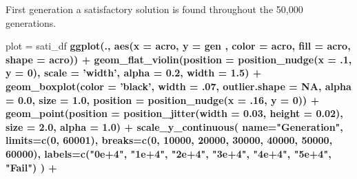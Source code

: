 \documentclass[]{book}
\newenvironment{Shaded}{\begin{snugshade}}{\end{snugshade}}
\newcommand{\DataTypeTok}[1]{\textcolor[rgb]{0.13,0.29,0.53}{#1}}
\newcommand{\DecValTok}[1]{\textcolor[rgb]{0.00,0.00,0.81}{#1}}
\newcommand{\FloatTok}[1]{\textcolor[rgb]{0.00,0.00,0.81}{#1}}
\newcommand{\KeywordTok}[1]{\textcolor[rgb]{0.13,0.29,0.53}{\textbf{#1}}}
\newcommand{\NormalTok}[1]{#1}
\newcommand{\OperatorTok}[1]{\textcolor[rgb]{0.81,0.36,0.00}{\textbf{#1}}}
\newcommand{\OtherTok}[1]{\textcolor[rgb]{0.56,0.35,0.01}{#1}}
\newcommand{\StringTok}[1]{\textcolor[rgb]{0.31,0.60,0.02}{#1}}
\begin{document}
First generation a satisfactory solution is found throughout the 50,000 generations.

\begin{Shaded}
\begin{Highlighting}[]
\NormalTok{plot =}\StringTok{ }\NormalTok{sati_df }\OperatorTok{%>%}
\StringTok{  }\KeywordTok{ggplot}\NormalTok{(., }\KeywordTok{aes}\NormalTok{(}\DataTypeTok{x =}\NormalTok{ acro, }\DataTypeTok{y =}\NormalTok{ gen , }\DataTypeTok{color =}\NormalTok{ acro, }\DataTypeTok{fill =}\NormalTok{ acro, }\DataTypeTok{shape =}\NormalTok{ acro)) }\OperatorTok{+}
\StringTok{  }\KeywordTok{geom_flat_violin}\NormalTok{(}\DataTypeTok{position =} \KeywordTok{position_nudge}\NormalTok{(}\DataTypeTok{x =} \FloatTok{.1}\NormalTok{, }\DataTypeTok{y =} \DecValTok{0}\NormalTok{), }\DataTypeTok{scale =} \StringTok{'width'}\NormalTok{, }\DataTypeTok{alpha =} \FloatTok{0.2}\NormalTok{, }\DataTypeTok{width =} \FloatTok{1.5}\NormalTok{) }\OperatorTok{+}
\StringTok{  }\KeywordTok{geom_boxplot}\NormalTok{(}\DataTypeTok{color =} \StringTok{'black'}\NormalTok{, }\DataTypeTok{width =} \FloatTok{.07}\NormalTok{, }\DataTypeTok{outlier.shape =} \OtherTok{NA}\NormalTok{, }\DataTypeTok{alpha =} \FloatTok{0.0}\NormalTok{, }\DataTypeTok{size =} \FloatTok{1.0}\NormalTok{, }\DataTypeTok{position =} \KeywordTok{position_nudge}\NormalTok{(}\DataTypeTok{x =} \FloatTok{.16}\NormalTok{, }\DataTypeTok{y =} \DecValTok{0}\NormalTok{)) }\OperatorTok{+}
\StringTok{  }\KeywordTok{geom_point}\NormalTok{(}\DataTypeTok{position =} \KeywordTok{position_jitter}\NormalTok{(}\DataTypeTok{width =} \FloatTok{0.03}\NormalTok{, }\DataTypeTok{height =} \FloatTok{0.02}\NormalTok{), }\DataTypeTok{size =} \FloatTok{2.0}\NormalTok{, }\DataTypeTok{alpha =} \FloatTok{1.0}\NormalTok{) }\OperatorTok{+}
\StringTok{  }\KeywordTok{scale_y_continuous}\NormalTok{(}
    \DataTypeTok{name=}\StringTok{"Generation"}\NormalTok{,}
    \DataTypeTok{limits=}\KeywordTok{c}\NormalTok{(}\DecValTok{0}\NormalTok{, }\DecValTok{60001}\NormalTok{),}
    \DataTypeTok{breaks=}\KeywordTok{c}\NormalTok{(}\DecValTok{0}\NormalTok{, }\DecValTok{10000}\NormalTok{, }\DecValTok{20000}\NormalTok{, }\DecValTok{30000}\NormalTok{, }\DecValTok{40000}\NormalTok{, }\DecValTok{50000}\NormalTok{, }\DecValTok{60000}\NormalTok{),}
    \DataTypeTok{labels=}\KeywordTok{c}\NormalTok{(}\StringTok{"0e+4"}\NormalTok{, }\StringTok{"1e+4"}\NormalTok{, }\StringTok{"2e+4"}\NormalTok{, }\StringTok{"3e+4"}\NormalTok{, }\StringTok{"4e+4"}\NormalTok{, }\StringTok{"5e+4"}\NormalTok{, }\StringTok{"Fail"}\NormalTok{)}
\NormalTok{  ) }\OperatorTok{+}
}
\end{Highlighting}
\end{Shaded}
\end{document}
